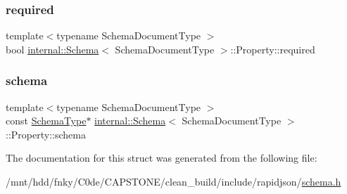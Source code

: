 \mbox{\label{structinternal_1_1Schema_1_1Property_a48dd761e20145ea74129c0d4fad5e1d4}} 
\subsubsection{\texorpdfstring{required}{required}}
{\footnotesize\ttfamily template$<$typename Schema\+Document\+Type $>$ \\
bool \hyperlink{classinternal_1_1Schema}{internal\+::\+Schema}$<$ Schema\+Document\+Type $>$\+::Property\+::required}

\mbox{\label{structinternal_1_1Schema_1_1Property_a8f152cf4f0ea5418a4fb3bf4c3746eb7}} 
\subsubsection{\texorpdfstring{schema}{schema}}
{\footnotesize\ttfamily template$<$typename Schema\+Document\+Type $>$ \\
const \hyperlink{classinternal_1_1Schema_ac2556ebf7a7db971e1c1c0f76eb5786e}{Schema\+Type}$\ast$ \hyperlink{classinternal_1_1Schema}{internal\+::\+Schema}$<$ Schema\+Document\+Type $>$\+::Property\+::schema}



The documentation for this struct was generated from the following file\+:\begin{DoxyCompactItemize}
\item 
/mnt/hdd/fnky/\+C0de/\+C\+A\+P\+S\+T\+O\+N\+E/clean\+\_\+build/include/rapidjson/\hyperlink{schema_8h}{schema.\+h}\end{DoxyCompactItemize}
